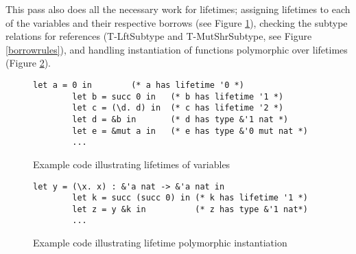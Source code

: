 \documentclass[letterpaper,11pt]{article}
\begin{document}
This pass also does all the necessary work for lifetimes; assigning lifetimes
to each of the variables and their respective borrows (see Figure \ref{varlifetimes}), 
checking the subtype relations for references (T-LftSubtype and T-MutShrSubtype, see Figure \ref{borrowrules}), and handling instantiation of functions polymorphic over
lifetimes (Figure \ref{lifetimepoly}). 

\begin{figure}[h]
    \begin{lstlisting}[language=caml]
        let a = 0 in        (* a has lifetime '0 *)
        let b = succ 0 in   (* b has lifetime '1 *)
        let c = (\d. d) in  (* c has lifetime '2 *)
        let d = &b in       (* d has type &'1 nat *)
        let e = &mut a in   (* e has type &'0 mut nat *)
        ...
    \end{lstlisting}

    \caption{Example code illustrating lifetimes of variables}
    \label{varlifetimes}
\end{figure}

\begin{figure}[h]
    \begin{lstlisting}[language=caml]
        let y = (\x. x) : &'a nat -> &'a nat in 
        let k = succ (succ 0) in (* k has lifetime '1 *)
        let z = y &k in          (* z has type &'1 nat*)
        ...
    \end{lstlisting}

    \caption{Example code illustrating lifetime polymorphic instantiation}
    \label{lifetimepoly}
\end{figure}
\end{document}
